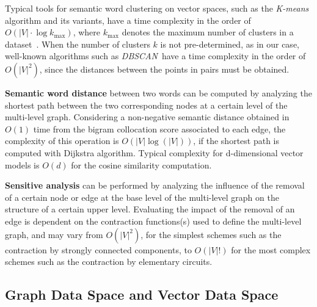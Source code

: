 Typical tools for semantic word clustering on vector spaces, such as the \textit{K-means} algorithm and its variants,
have a time complexity in the order of $O(|V| \cdot \log{k_{\max}})$, where $k_{\max}$ denotes the maximum number of
clusters in a dataset~\cite{Ahmed20}.
When the number of clusters $k$ is not pre-determined, as in our case, well-known algorithms such as \textit{DBSCAN}~\cite{Ester96}have a time complexity in the order of $O(|V|^2)$, since the distances between the points in pairs must be obtained.
\newline

\textbf{Semantic word distance} between two words can be computed by analyzing the shortest path between the two
corresponding nodes at a certain level of the multi-level graph.
Considering a non-negative semantic distance obtained in $O(1)$ time from the bigram collocation score associated
to each edge, the complexity of this operation is $O(|V| \log(|V|))$, if the shortest path is computed with Dijkstra
algorithm. \newline
Typical complexity for d-dimensional vector models is $O(d)$ for the cosine similarity computation. \newline

\textbf{Sensitive analysis} can be performed by analyzing the influence of the removal of a certain node or edge at
the base level of the multi-level graph on the structure of a certain upper level.
Evaluating the impact of the removal of an edge is dependent on the contraction functions(s) used to define the
multi-level graph, and may vary from $O(|V|^2)$, for the simplest schemes such as the contraction by strongly connected
components, to $O(|V|!)$ for the most complex schemes such as the contraction by elementary circuits.

\subsection{Graph Data Space and Vector Data Space}

